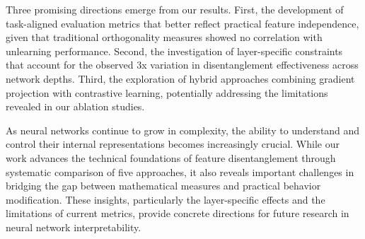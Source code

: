 \documentclass{article} %
\begin{document}
Three promising directions emerge from our results. First, the development of task-aligned evaluation metrics that better reflect practical feature independence, given that traditional orthogonality measures showed no correlation with unlearning performance. Second, the investigation of layer-specific constraints that account for the observed 3x variation in disentanglement effectiveness across network depths. Third, the exploration of hybrid approaches combining gradient projection with contrastive learning, potentially addressing the limitations revealed in our ablation studies.

As neural networks continue to grow in complexity, the ability to understand and control their internal representations becomes increasingly crucial. While our work advances the technical foundations of feature disentanglement through systematic comparison of five approaches, it also reveals important challenges in bridging the gap between mathematical measures and practical behavior modification. These insights, particularly the layer-specific effects and the limitations of current metrics, provide concrete directions for future research in neural network interpretability.



\end{document}
